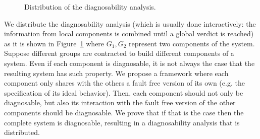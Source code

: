 \documentclass[a4paper]{article}
\begin{document}
\begin{figure}[h]
{\def\kbbox[#1,#2,#3,#4,#5]#6{
        \draw[dashed] node[draw,color=gray!50,minimum
        height=#1,minimum width=#2] (#4) at #5 {}; 
        \node[anchor=#3,inner sep=2pt] at (#4.#3)  {#6};
}

\def\soledge[#1,#2,#3,#4];{
        \draw[dashed,-latex,#4] (#1) -- #3 (#2);
}

   }
  \caption{Distribution of the diagnosability analysis.}
  \label{fig:motivation}
\end{figure}

We distribute the diagnosability analysis (which is usually done interactively: the information from local components is combined until a global verdict is reached) as it is shown in Figure~\ref{fig:motivation} where $G_1, G_2$ represent two components of the system. Suppose different groups are contracted to build different components of a system. Even if each component is diagnosable, it is not always the case that the resulting system has such property. We propose a framework where each component only shares with the others a fault free version of its own (e.g. the specification of its ideal behavior). Then, each component should not only be diagnosable, but also its interaction with the fault free version of the other components should be diagnosable. We prove that if that is the case then the complete system is diagnosable, resulting in a diagnosability analysis that is distributed.
\end{document}
